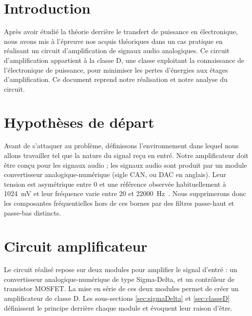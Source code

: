 \documentclass[10pt, oneside, a4paper]{article}
\begin{document}
\tableofcontents
\newpage

\section{Introduction}
Après avoir étudié la théorie derrière le transfert de puissance en électronique,
nous avons mis à l'épreuve nos acquis théoriques dans un cas pratique en réalisant un circuit d'amplification de signaux audio analogiques.
Ce circuit d'amplification appartient à la classe D, une classe exploitant la connaissance de l'électronique de puissance, pour minimiser les pertes d'énergies aux étages d'amplification.
Ce document reprend notre réalisation et notre analyse du circuit.


\section{Hypothèses de départ}
\label{sec:hypothese}
Avant de s'attaquer au problème, définissons l'environnement dans lequel nous allons travailler tel que la nature du signal reçu en entré.
Notre amplificateur doit être conçu pour les signaux audio ;
les signaux audio sont produit par un module convertisseur analogique-numérique (sigle CAN, ou DAC en anglais).
Leur tension est asymétrique entre \num{0} et une référence observée habituellement à \SI{1024}{\milli\volt} et leur fréquence varie entre \num{20} et \SI{22000}{\hertz}~\cite{heffner2007hearing}.
Nous supprimerons donc les composantes fréquentielles hors de ces bornes par des filtres passe-haut et passe-bas distincts.


\section{Circuit amplificateur}
Le circuit réalisé repose sur deux modules pour amplifier le signal d'entré :
un convertisseur analogique-numérique de type Sigma-Delta, et un contrôleur de transistor MOSFET.
La mise en série de ces deux modules permet de créer un amplificateur de classe D.
Les sous-sections \ref{sec:sigmaDelta} et \ref{sec:classeD} définissent le principe derrière chaque module et évoquent leur raison d'être.
\end{document}
